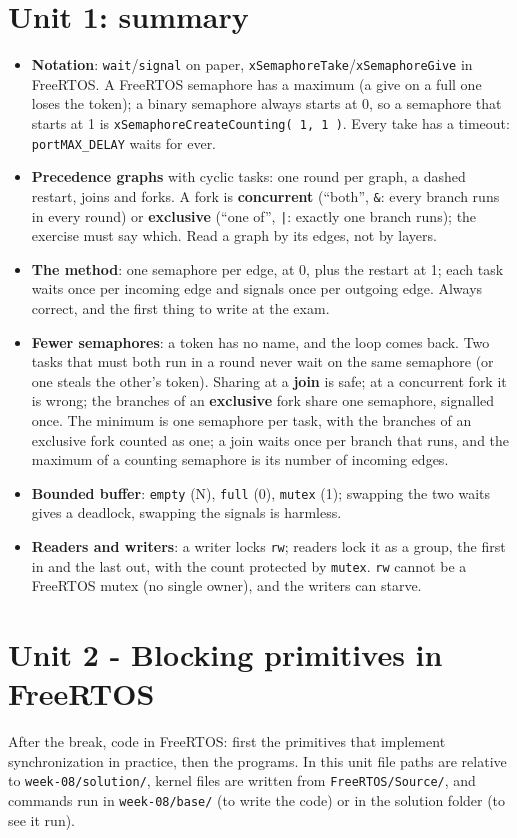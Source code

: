 \section{Unit 1: summary}
\begin{itemize}
    \item \textbf{Notation}: \texttt{wait}/\texttt{signal} on paper, \texttt{xSemaphoreTake}/\texttt{xSemaphoreGive} in FreeRTOS. A FreeRTOS semaphore has a maximum (a give on a full one loses the token); a binary semaphore always starts at 0, so a semaphore that starts at 1 is \texttt{xSemaphoreCreateCounting( 1, 1 )}. Every take has a timeout: \texttt{portMAX\_DELAY} waits for ever.
    \item \textbf{Precedence graphs} with cyclic tasks: one round per graph, a dashed restart, joins and forks. A fork is \textbf{concurrent} (``both'', \texttt{\&}: every branch runs in every round) or \textbf{exclusive} (``one of'', \texttt{|}: exactly one branch runs); the exercise must say which. Read a graph by its edges, not by layers.
    \item \textbf{The method}: one semaphore per edge, at 0, plus the restart at 1; each task waits once per incoming edge and signals once per outgoing edge. Always correct, and the first thing to write at the exam.
    \item \textbf{Fewer semaphores}: a token has no name, and the loop comes back. Two tasks that must both run in a round never wait on the same semaphore (or one steals the other's token). Sharing at a \textbf{join} is safe; at a concurrent fork it is wrong; the branches of an \textbf{exclusive} fork share one semaphore, signalled once. The minimum is one semaphore per task, with the branches of an exclusive fork counted as one; a join waits once per branch that runs, and the maximum of a counting semaphore is its number of incoming edges.
    \item \textbf{Bounded buffer}: \texttt{empty} (N), \texttt{full} (0), \texttt{mutex} (1); swapping the two waits gives a deadlock, swapping the signals is harmless.
    \item \textbf{Readers and writers}: a writer locks \texttt{rw}; readers lock it as a group, the first in and the last out, with the count protected by \texttt{mutex}. \texttt{rw} cannot be a FreeRTOS mutex (no single owner), and the writers can starve.
\end{itemize}

\section{Unit 2 - Blocking primitives in FreeRTOS}
After the break, code in FreeRTOS: first the primitives that implement synchronization in practice, then the programs. In this unit file paths are relative to \texttt{week-08/\allowbreak solution/}, kernel files are written from \texttt{FreeRTOS/Source/}, and commands run in \texttt{week-08/base/} (to write the code) or in the solution folder (to see it run).

